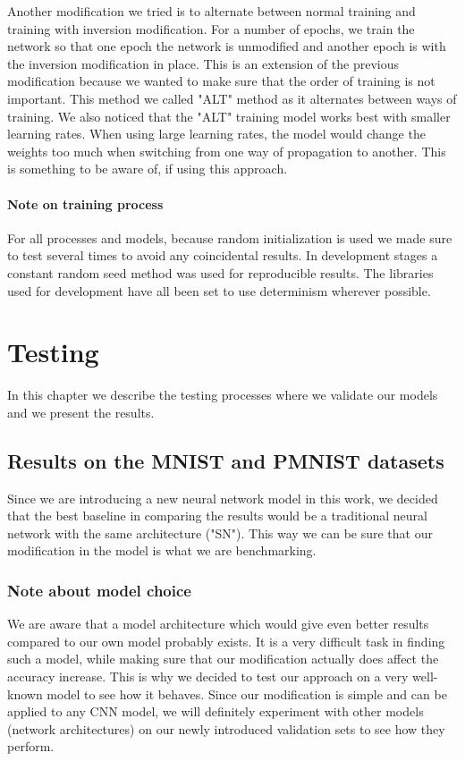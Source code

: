 \documentclass[b5paper]{book}
\begin{document}
Another modification we tried is to alternate between normal training and training with inversion modification. For a number of epochs, we train the network so that one epoch the network is unmodified and another epoch is with the inversion modification in place. This is an extension of the previous modification because we wanted to make sure that the order of training is not important. This method we called "ALT" method as it alternates between ways of training. We also noticed that the "ALT" training model works best with smaller learning rates. When using large learning rates, the model would change the weights too much when switching from one way of propagation to another. This is something to be aware of, if using this approach.

\subsubsection{Note on training process}

For all processes and models, because random initialization is used we made sure to test several times to avoid any coincidental results. In development stages a constant random seed method was used for reproducible results. The libraries used for development have all been set to use determinism wherever possible.

\chapter{Testing}

In this chapter we describe the testing processes where we validate our models and we present the results.

\section{Results on the MNIST and PMNIST datasets}

Since we are introducing a new neural network model in this work, we decided that the best baseline in comparing the results would be a traditional neural network with the same architecture ("SN"). This way we can be sure that our modification in the model is what we are benchmarking.

\subsection{Note about model choice} \label{modelchoice}

We are aware that a model architecture which would give even better results compared to our own model probably exists. It is a very difficult task in finding such a model, while making sure that our modification actually does affect the accuracy increase. This is why we decided to test our approach on a very well-known model to see how it behaves. Since our modification is simple and can be applied to any CNN model, we will definitely experiment with other models (network architectures) on our newly introduced validation sets to see how they perform.
\end{document}

